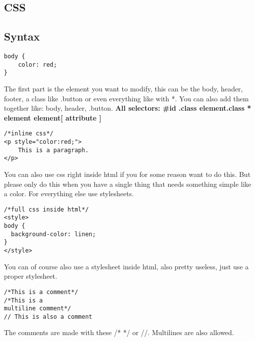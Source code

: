 \documentclass[main.tex,fontsize=6pt,paper=a4,paper=landscape,DIV=calc,]{scrartcl}
\begin{document}
\begin{multicols*}{4}
\section{CSS}
\subsection{Syntax}

\vspace{-2mm}
\begin{lstlisting}
body { 
    color: red;
}
\end{lstlisting}
\vspace{2mm}

The first part is the element you want to modify, this can be the body, header, footer, a class like .button or even everything like with *. You can also add them together like: body, header, .button. \newline
\textbf{All selectors: \#id .class element.class * element element[ attribute ]}


\vspace{-2mm}
\begin{lstlisting}
/*inline css*/
<p style="color:red;">
    This is a paragraph.
</p>
\end{lstlisting}
\vspace{2mm}

You can also use css right inside html if you for some reason want to do this. But please only do this when you have a single thing that needs something simple like a color. \newline For everything else use stylesheets.



\vspace{-2mm}
\begin{lstlisting}
/*full css inside html*/
<style>
body {
  background-color: linen;
}
</style>
\end{lstlisting}
\vspace{2mm}
You can of course also use a stylesheet inside html, also pretty useless, just use a proper stylesheet.



\vspace{-2mm}
\begin{lstlisting}
/*This is a comment*/ 
/*This is a 
multiline comment*/
// This is also a comment
\end{lstlisting}
\vspace{2mm}
The comments are made with these /* */ or //. Multilines are also allowed.



\end{multicols*}
\end{document}
